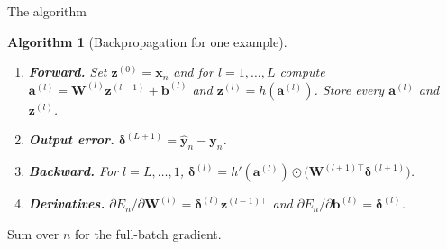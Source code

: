 \documentclass[aspectratio=169, 11pt]{beamer}
\newtheorem{algox}[theorem]{Algorithm}
\newcommand{\src}[3]{}      %
\begin{document}
\begin{frame}{The algorithm}
  \src{bishop2024}{algorithm}{8.1}
  \src{bishop2024}{equation}{8.14}
  \src{prince2023}{section}{7.4.1}
  \vspace{0.2em}
  \begin{algox}[Backpropagation for one example]
    {\small
    \begin{enumerate}\setlength{\itemsep}{2pt}
      \item \textbf{Forward.} Set $\mathbf{z}^{(0)}=\mathbf{x}_n$ and
            for $l=1,\dots,L$ compute
            $\mathbf{a}^{(l)}=\mathbf{W}^{(l)}\mathbf{z}^{(l-1)}
            +\mathbf{b}^{(l)}$ and
            $\mathbf{z}^{(l)}=h(\mathbf{a}^{(l)})$. \alert{Store every
            $\mathbf{a}^{(l)}$ and $\mathbf{z}^{(l)}$.}
      \item \textbf{Output error.} $\bm\delta^{(L+1)}
            =\hat{\mathbf{y}}_n-\mathbf{y}_n$.
      \item \textbf{Backward.} For $l=L,\dots,1$,
            $\bm\delta^{(l)} = h'(\mathbf{a}^{(l)})\odot
            \big(\mathbf{W}^{(l+1)\top}\bm\delta^{(l+1)}\big)$.
      \item \textbf{Derivatives.}
            $\partial E_n/\partial\mathbf{W}^{(l)}
            = \bm\delta^{(l)}\mathbf{z}^{(l-1)\top}$ and
            $\partial E_n/\partial\mathbf{b}^{(l)}=\bm\delta^{(l)}$.
    \end{enumerate}}
  \end{algox}
  \vspace{0.2em}
  {\small Sum over $n$ for the full-batch gradient.}
\end{frame}
\end{document}
